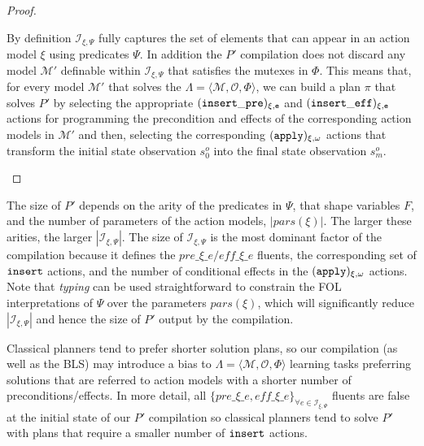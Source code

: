 \documentclass[runningheads]{llncs}
\newcommand{\tup}[1]{{\langle #1 \rangle}}
\begin{document}
{\begin{proof}[Proof]
\begin{small}
By definition ${\mathcal I}_{\xi,\Psi}$ fully captures the set of elements that can appear in an action model $\xi$ using predicates $\Psi$. In addition the $P'$ compilation does not discard any model $\mathcal{M}'$ definable within ${\mathcal I}_{\xi,\Psi}$ that satisfies the mutexes in $\Phi$. This means that, for every model $\mathcal{M}'$ that solves the $\Lambda=\tup{\mathcal{M},{\mathcal O},\Phi}$, we can build a plan $\pi$ that solves $P'$ by selecting the appropriate ${\tt \small (insert\_pre)_{\xi,e}}$ and ${\tt \small (insert\_eff)_{\xi,e}}$ actions for programming the precondition and effects of the corresponding action models in $\mathcal{M}'$ and then, selecting the corresponding ${\tt \small (apply)_{\xi,\omega}}$ actions that transform the initial state observation $s_0^o$ into the final state observation $s_m^o$.
\end{small}
\end{proof}

The size of $P'$ depends on the arity of the predicates in $\Psi$, that shape variables $F$, and the number of parameters of the action models, $|pars(\xi)|$. The larger these arities, the larger $|{\mathcal I}_{\xi,\Psi}|$. The size of ${\mathcal I}_{\xi,\Psi}$ is the most dominant factor of the compilation because it defines the $pre\_\xi\_e/eff\_\xi\_e$ fluents, the corresponding set of ${\tt \small insert}$ actions, and the number of conditional effects in the ${\tt \small (apply)_{\xi,\omega}}$ actions. Note that {\em typing} can be used straightforward to constrain the FOL interpretations of $\Psi$ over the parameters $pars(\xi)$, which will significantly reduce $|{\mathcal I}_{\xi,\Psi}|$ and hence the size of $P'$ output by the compilation.

Classical planners tend to prefer shorter solution plans, so our compilation (as well as the BLS) may introduce a bias to $\Lambda=\tup{\mathcal{M},{\mathcal O},\Phi}$ learning tasks preferring solutions that are referred to action models with a shorter number of preconditions/effects. In more detail, all $\{pre\_\xi\_e, eff\_\xi\_e\}_{\forall e\in{\mathcal I}_{\xi,\Psi}}$ fluents are false at the initial state of our $P'$ compilation so classical planners tend to solve $P'$ with plans that require a smaller number of ${\tt{\small insert}}$ actions.

}
\end{document}
